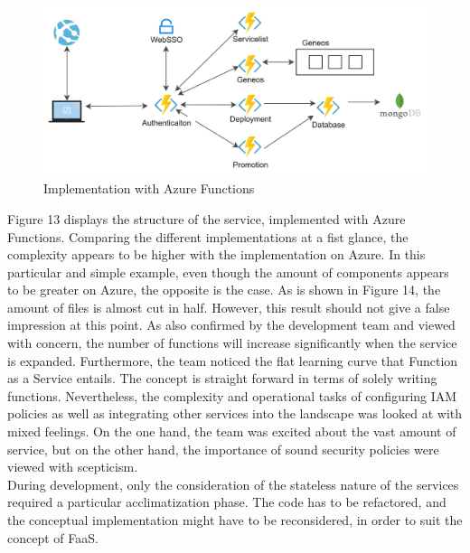 \documentclass[a4paper,11pt, pagesize]{scrartcl}
\begin{document}
\begin{spacing}{1.2}
\begin{figure}[H]
\label{fig:azure}
\centering
\includegraphics[width=1\textwidth]{azure.jpg}
\caption{Implementation with Azure Functions}
\end{figure} 
Figure 13 displays the structure of the service, implemented with Azure Functions. Comparing the different implementations at a fist glance, the complexity appears to be higher with the implementation on Azure. In this particular and simple example, even though the amount of components appears to be greater on Azure, the opposite is the case. As is shown in Figure 14, the amount of files is almost cut in half. However, this result should not give a false impression at this point. As also confirmed by the development team and viewed with concern, the number of functions will increase significantly when the service is expanded. Furthermore, the team noticed the flat learning curve that Function as a Service entails. The concept is straight forward in terms of solely writing functions. Nevertheless, the complexity and operational tasks of configuring IAM policies as well as integrating other services into the landscape was looked at with mixed feelings.
On the one hand, the team was excited about the vast amount of service, but on the other hand, the importance of sound security policies were viewed with scepticism.\\
During development, only the consideration of the stateless nature of the services required a particular acclimatization phase. The code has to be refactored, and the conceptual implementation might have to be reconsidered, in order to suit the concept of FaaS. %
\begin{figure}[H]

\end{figure}
\end{spacing}
\end{document}
